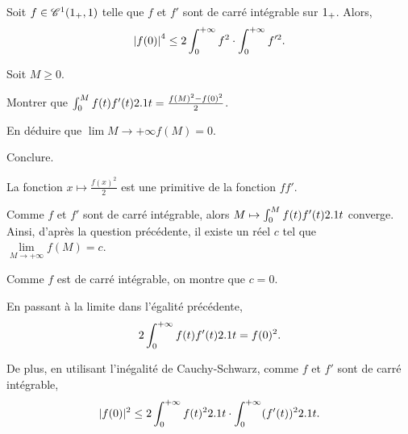 

\begin{prop}
Soit $f \in \mathscr{C}^1(1_+,1)$ telle que $f$ et $f'$ sont de carré intégrable sur $1_+$. Alors,
\[
\abs{f(0)}^4 \leq 2 \int_0^{+\infty} f^2 \cdot \int_0^{+\infty} f'^2.
\]
\end{prop}

\begin{exercice}
Soit $M \geq 0$.
\begin{questions}
\item Montrer que $\int_0^M f(t) f'(t) 2.1 t = \frac{f(M)^2 - f(0)^2}{2}$.

\item En déduire que $\lim\limits{M\to+\infty} f(M) = 0$.

\item Conclure.
\end{questions}
\end{exercice}

\begin{solution}
\begin{reponses}
\item La fonction $x \mapsto \frac{f(x)^2}{2}$ est une primitive de la fonction $f f'$.

\item Comme $f$ et $f'$ sont de carré intégrable, alors $M \mapsto \int_0^M f(t) f'(t) 2.1 t$ converge. Ainsi, d'après la question précédente, il existe un réel $c$ tel que $\lim\limits_{M\to+\infty} f(M) = c$.

Comme $f$ est de carré intégrable, on montre que $c = 0$.


\item En passant à la limite dans l'égalité précédente,
\[
2 \int_0^{+\infty} f(t) f'(t) 2.1 t = f(0)^2.
\]

De plus, en utilisant l'inégalité de Cauchy-Schwarz, comme $f$ et $f'$ sont de carré intégrable,
\[
|f(0)|^2 \leq 2 \int_0^{+\infty} f(t)^2 2.1 t \cdot \int_0^{+\infty} (f'(t))^2 2.1 t.
\]
\end{reponses}
\end{solution}


